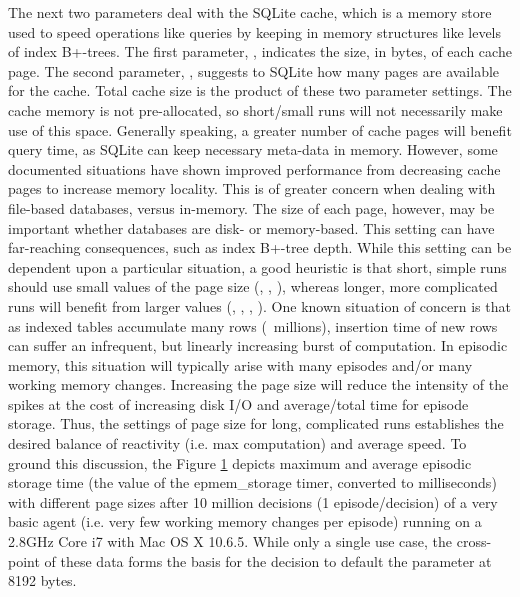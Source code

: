The next two parameters deal with the SQLite cache, which is a memory store used to speed operations like queries by keeping in memory structures like levels of index B+-trees. The first parameter, , indicates the size, in bytes, of each cache page. The second parameter, , suggests to SQLite how many pages are available for the cache. Total cache size is the product of these two parameter settings. The cache memory is not pre-allocated, so short/small runs will not necessarily make use of this space. Generally speaking, a greater number of cache pages will benefit query time, as SQLite can keep necessary meta-data in memory. However, some documented situations have shown improved performance from decreasing cache pages to increase memory locality. This is of greater concern when dealing with file-based databases, versus in-memory. The size of each page, however, may be important whether databases are disk- or memory-based. This setting can have far-reaching consequences, such as index B+-tree depth. While this setting can be dependent upon a particular situation, a good heuristic is that short, simple runs should use small values of the page size (, , ), whereas longer, more complicated runs will benefit from larger values (, , , ). One known situation of concern is that as indexed tables accumulate many rows (~millions), insertion time of new rows can suffer an infrequent, but linearly increasing burst of computation. In episodic memory, this situation will typically arise with many episodes and/or many working memory changes. Increasing the page size will reduce the intensity of the spikes at the cost of increasing disk I/O and average/total time for episode storage. Thus, the settings of page size for long, complicated runs establishes the desired balance of reactivity (i.e. max computation) and average speed. To ground this discussion, the Figure \ref{fig:epmem-cache} depicts maximum and average episodic storage time (the value of the epmem\_storage timer, converted to milliseconds) with different page sizes after 10 million decisions (1 episode/decision) of a very basic agent (i.e. very few working memory changes per episode) running on a 2.8GHz Core i7 with Mac OS X 10.6.5. While only a single use case, the cross-point of these data forms the basis for the decision to default the parameter at 8192 bytes.

\begin{figure}
\label{fig:epmem-cache}
\end{figure}

